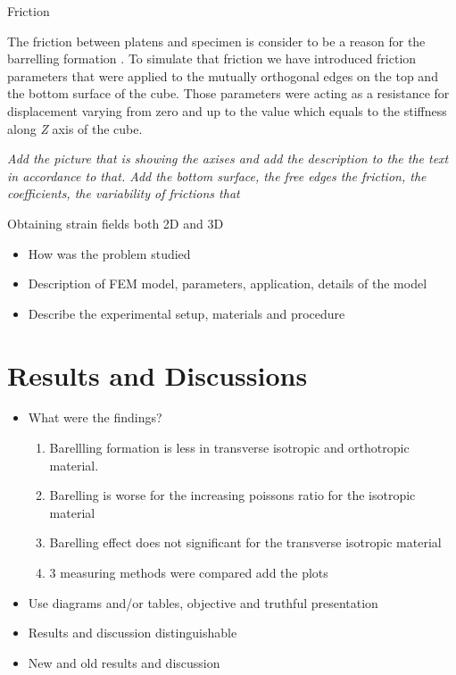 \documentclass[review]{elsarticle}
\begin{document}
\begin{description}
\item[{\color {red}Friction}]
\end{description}

The friction between platens and specimen is consider to be a reason for the
barrelling formation \cite{Narayanasamy198821, kulkarni1969}.  To simulate that
friction we have introduced friction parameters that were applied to the mutually orthogonal
edges on the top and the bottom surface of the cube. Those parameters were
acting as a resistance for displacement varying from zero and up to the value
which equals to the stiffness along \textit{Z} axis of the cube.

\textit{\color {red}Add the picture that is showing the axises and add the
description to the the text in accordance to that. Add the bottom surface, the
free edges the friction, the coefficients, the variability of frictions that }

\begin{description}
\item[{\color {red}Obtaining strain fields both 2D and 3D}]
\end{description}

\begin{itemize}
\color{red}
\item How was the problem studied 
\item Description of FEM model, parameters, application, details of the model
\item Describe the experimental setup, materials and procedure
\end{itemize}


\section{Results and Discussions}
\begin{itemize}
\color{red}
\item What were the findings?

	\begin{enumerate}
	\color{black}
		\item Barellling formation is less in transverse isotropic and orthotropic
		material.
		\item Barelling is worse for the increasing poissons ratio for the isotropic
		material
		\item Barelling effect does not significant for the transverse isotropic
		material
		\item 3 measuring methods were compared {\color{red} add the plots}
	\end{enumerate}



\item Use diagrams and/or tables, objective and truthful presentation
\item Results and discussion distinguishable
\item New and old results and discussion
\end{itemize}
\end{document}
